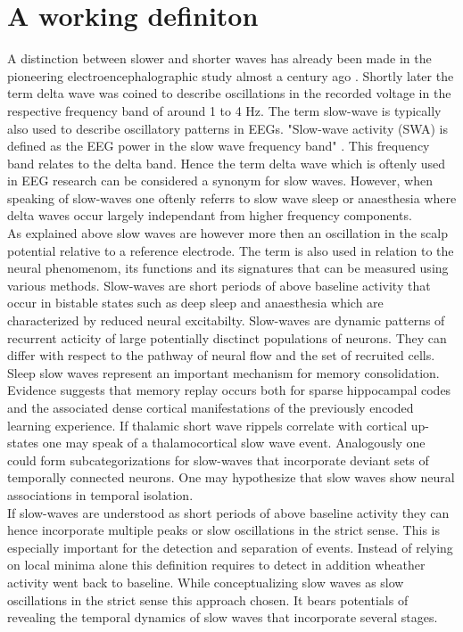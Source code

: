\section{A working definiton}
\label{working_definition}
A distinction between slower and shorter waves has already been made in the pioneering electroencephalographic study almost a century ago \parencite[p. 550]{berger1929}. Shortly later the term delta wave was coined to describe oscillations in the recorded voltage in the respective frequency band of around 1 to 4 Hz. The term slow-wave is typically also used to describe oscillatory patterns in EEGs. "Slow-wave activity (SWA) is defined as the EEG power in the slow wave frequency band" \parencite[p. 1]{furrer2019sleep}. This frequency band relates to the delta band. Hence the term delta wave which is oftenly used in EEG research can be considered a synonym for slow waves. However, when speaking of slow-waves one oftenly referrs to slow wave sleep or anaesthesia where delta waves occur largely independant from higher frequency components.\\
As explained above slow waves are however more then an oscillation in the scalp potential relative to a reference electrode. The term is also used in relation to the neural phenomenom, its functions and its signatures that can be measured using various methods. Slow-waves are short periods of above baseline activity that occur in bistable states such as deep sleep and anaesthesia which are characterized by reduced neural excitabilty. Slow-waves are dynamic patterns of recurrent acticity of large potentially disctinct populations of neurons. They can differ with respect to the pathway of neural flow and the set of recruited cells. Sleep slow waves represent an important mechanism for memory consolidation. Evidence suggests that memory replay occurs both for sparse hippocampal codes and the associated dense cortical manifestations of the previously encoded learning experience. If thalamic short wave rippels correlate with cortical up-states one may speak of a thalamocortical slow wave event. Analogously one could form subcategorizations for slow-waves that incorporate deviant sets of temporally connected neurons. One may hypothesize that slow waves show neural associations in temporal isolation.  \\
If slow-waves are understood as short periods of above baseline activity they can hence incorporate multiple peaks or slow oscillations in the strict sense. This is especially important for the detection and separation of events. Instead of relying on local minima alone this definition requires to detect in addition wheather activity went back to baseline. While conceptualizing slow waves as slow oscillations in the strict sense this approach chosen. It bears potentials of revealing the temporal dynamics of slow waves that incorporate several stages.
